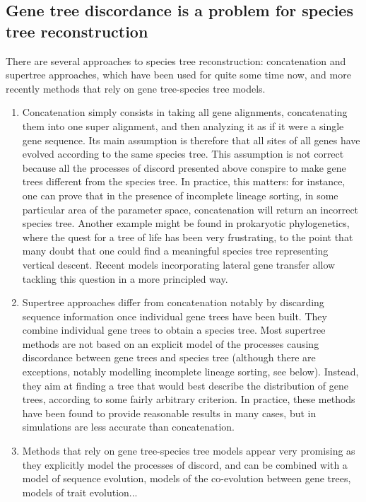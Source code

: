 \documentclass[11pt]{article}
\begin{document}
\subsection*{Gene tree discordance is a problem for species tree reconstruction}
There are several approaches to species tree reconstruction: concatenation and supertree approaches, which have been used for quite some time now, and more recently methods that rely on gene tree-species tree models.\begin{enumerate}
\item Concatenation simply consists in taking all gene alignments, concatenating them into one super alignment, and then analyzing it as if it were a single gene sequence.
Its main assumption is therefore that all sites of all genes have evolved according to the same species tree.
This assumption is not correct because all the processes of discord presented above conspire to make gene trees different from the species tree.
In practice, this matters: for instance, one can prove that in the presence of incomplete lineage sorting, in some particular area of the parameter space, concatenation will return an incorrect species tree.
Another example might be found in prokaryotic phylogenetics, where the quest for a tree of life has been very frustrating, to the point that many doubt that one could find a meaningful species tree representing vertical descent.
Recent models incorporating lateral gene transfer allow tackling this question in a more principled way.
\item Supertree approaches differ from concatenation notably by discarding sequence information once individual gene trees have been built.
They combine individual gene trees to obtain a species tree.
Most supertree methods are not based on an explicit model of the processes causing discordance between gene trees and species tree (although there are exceptions, notably modelling incomplete lineage sorting, see below).
Instead, they aim at finding a tree that would best describe the distribution of gene trees, according to some fairly arbitrary criterion.
In practice, these methods have been found to provide reasonable results in many cases, but in simulations are less accurate than concatenation.
\item Methods that rely on gene tree-species tree models appear very promising as they explicitly model the processes of discord, and can be combined with a model of sequence evolution, models of the co-evolution between gene trees, models of trait evolution... 
\end{enumerate}
\end{document}
